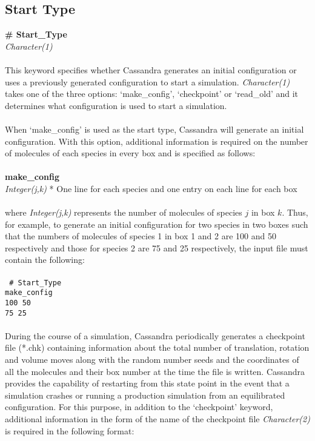\subsection{Start Type}\label{sec:Start_Type}
{\bf \# Start\_Type} \\
{\it Character(1) } \\ \\
%
This keyword specifies whether Cassandra generates an initial configuration or uses a previously generated configuration
to start a simulation. {\it Character(1)} takes one of the three options: `make\_config', `checkpoint' or `read\_old' and it
determines what configuration is used to start a simulation.   \\ \\
%
When `make\_config'  is used as the start type, Cassandra will generate an initial configuration. With this option, additional
information is required on the number of molecules of each species in every box and is specified as follows: \\ \\
%
%
{\bf make\_config} \\
{\it Integer(j,k)} * One line for each species and one entry on each line for each box\\ \\
% 
 where {\it Integer(j,k)} represents the number of molecules of species $j$ in box $k$. Thus, for example, to generate an initial configuration
 for two species in two boxes such that the numbers of molecules of species 1 in box 1 and 2 are 100 and 50 respectively and those for
 species 2 are 75 and 25 respectively, the input file must contain the following: \\ \\
 \texttt{
 \# Start\_Type \\
 make\_config \\
 100 50 \\
 75 25 \\ \\}
%
During the course of a simulation, Cassandra periodically generates a checkpoint file (*.chk) containing information about the total number of translation, rotation and
volume moves along with the random number seeds and the coordinates of all the molecules and their box number at the time the file is written. Cassandra provides
the capability of restarting from this state point in the event that a simulation crashes or running a production simulation from an equilibrated configuration. For this
purpose, in addition to the `checkpoint' keyword, additional information in the form of the name of the checkpoint file {\it Character(2)} is required in the following format: \\ \\
